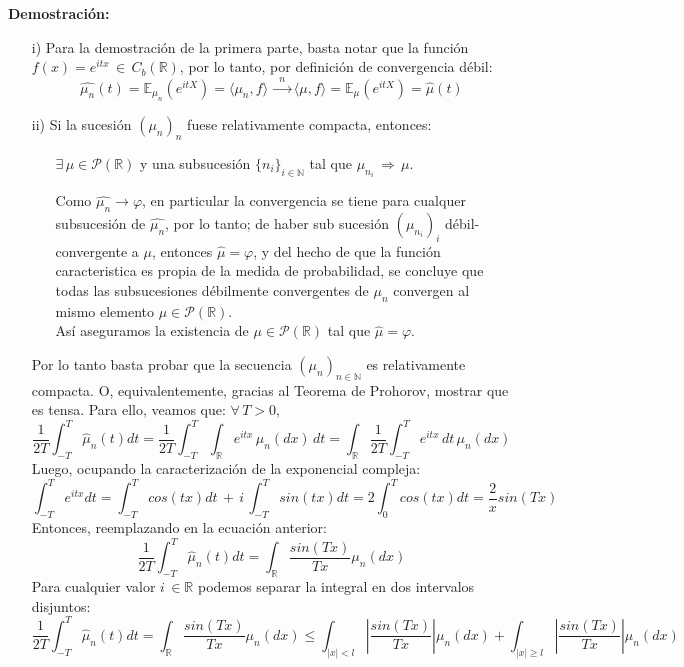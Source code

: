 \documentclass[a4paper]{article}
\numberwithin{equation}{subsection}
\numberwithin{definicion}{subsection}
\def\R{\mathbb R}
\def\N{\mathbb N}
\def\E{\mathbb E}
\begin{document}
\textbf{Demostración:} \begin{itemize}
    \item[i)] Para la demostración de la primera parte, basta notar que la función $f(x) = e^{itx}\,\in\,C_b(\R)$, por lo tanto, por definición de convergencia débil:
    \[\hat{\mu_n}(t) = \E_{\mu_n}(e^{itX}) = \langle \mu_n , f\rangle\,\xrightarrow{\,\,\,n\,\,\,}\langle \mu, f \rangle = \E_{\mu}(e^{itX}) = \hat{\mu}(t)\]
    
    \item[ii)] Si la sucesión $(\mu_n)_n$ fuese relativamente compacta, entonces:
    \begin{itemize}
        \item[\cdot] $\exists\,\mu\in\mathcal{P}(\R)$ y una subsucesión $\{n_i\}_{i \in \N}$ tal que $\mu_{n_i}\,\Rightarrow\,\mu$.
        \item[\cdot] Como $\hat{\mu_n}\rightarrow\varphi$, en particular la convergencia se tiene para cualquer subsucesión de $\hat{\mu_n}$, por lo tanto; de haber sub sucesión $(\mu_{n_i})_{i}$ débil-convergente a $\mu$, entonces $\hat{\mu} = \varphi$, y del hecho de que la función caracteristica es propia de la medida de probabilidad, se concluye que todas las subsucesiones débilmente convergentes de $\mu_n$ convergen al mismo elemento $\mu\in\mathcal{P}(\R)$.\\ \newline
        Así aseguramos la existencia de $\mu \in \mathcal{P}(\R)$ tal que $\hat{\mu} = \varphi$.
    \end{itemize}
    Por lo tanto basta probar que la secuencia $(\mu_n)_{n\in\N}$ es relativamente compacta. O, equivalentemente, gracias al Teorema de Prohorov, mostrar que es tensa. Para ello, veamos que: $\forall\,T>0$,
    \[\frac{1}{2T}\int_{-T}^{T}\hat{\mu}_n(t)dt = \frac{1}{2T}\int_{-T}^{T}\int_{\R}e^{itx}\,\mu_n(dx)\,dt = \int_{\R}\frac{1}{2T}\int_{-T}^{T} e^{itx}\,dt\,\mu_n(dx) \]
    Luego, ocupando la caracterización de la exponencial compleja:
    \[\int_{-T}^{T}e^{itx}dt = \int_{-T}^{T}cos(tx)dt\,+\,i\,\int_{-T}^T sin(tx)dt = 2\int_{0}^{T}cos(tx)dt = \frac{2}{x}sin(Tx)\]
    Entonces, reemplazando en la ecuación anterior:
    \[\frac{1}{2T}\int_{-T}^{T}\hat{\mu}_n(t)dt = \int_{\R}\frac{sin(Tx)}{Tx}\mu_n(dx)\]
    Para cualquier valor $i\,\in\R$ podemos separar la integral en dos intervalos disjuntos:
    \[\frac{1}{2T}\int_{-T}^{T}\hat{\mu}_n(t)dt = \int_{\R}\frac{sin(Tx)}{Tx}\mu_n(dx) \leq \int_{|x|<l}\left|\frac{sin(Tx)}{Tx}\right| \mu_n(dx) + \int_{|x|\geq l}\left|\frac{sin(Tx)}{Tx}\right|\mu_n(dx)\]

\end{itemize}
\end{document}
